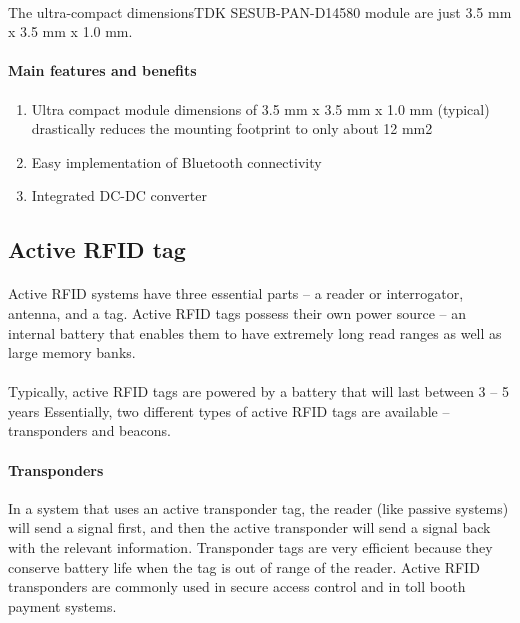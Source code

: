 \documentclass[12pt,a4paper]{article}
\begin{document}
\begin{appendices}
      \paragraph{}
      The ultra-compact dimensionsTDK SESUB-PAN-D14580 module are just 3.5 mm x 3.5 mm x 1.0 mm.
      \paragraph{Main features and benefits}  
      \begin{enumerate}
        \item Ultra compact module dimensions of 3.5 mm x 3.5 mm x 1.0 mm (typical) drastically reduces the mounting footprint to only about 12 mm2
        \item Easy implementation of Bluetooth connectivity
        \item Integrated DC-DC converter
      \end{enumerate}
    
    \subsection{Active RFID tag}
      \paragraph{}
        Active RFID systems have three essential parts – a reader or interrogator, antenna, and a tag. Active RFID tags possess their own power source – an internal battery that enables them to have extremely long read ranges as well as large memory banks.
      \paragraph{}
        Typically, active RFID tags are powered by a battery that will last between 3 – 5 years Essentially, two different types of active RFID tags are available – transponders and beacons.
      \paragraph{Transponders} 
        In a system that uses an active transponder tag, the reader (like passive systems) will send a signal first, and then the active transponder will send a signal back with the relevant information. Transponder tags are very efficient because they conserve battery life when the tag is out of range of the reader. Active RFID transponders are commonly used in secure access control and in toll booth payment systems.

\end{appendices}
\end{document}
